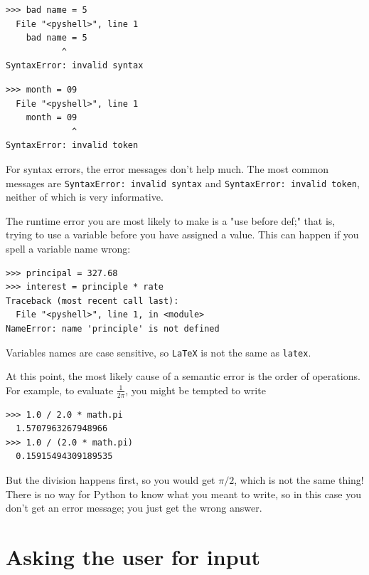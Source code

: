 \begin{Verbatim}[frame=single]
>>> bad name = 5
  File "<pyshell>", line 1
    bad name = 5
           ^
SyntaxError: invalid syntax
\end{Verbatim}

\begin{Verbatim}[frame=single]
>>> month = 09
  File "<pyshell>", line 1
    month = 09
             ^
SyntaxError: invalid token
\end{Verbatim}

For syntax errors, the error messages don't help much. The most common messages are
\texttt{SyntaxError:\ invalid\ syntax} and
\texttt{SyntaxError:\ invalid\ token}, neither of which is very informative.

  
 

The runtime error you are most likely to make is a "use before def;" that is, trying to use a variable before you have assigned a value. This can happen if you spell a variable name wrong:

\begin{Verbatim}[frame=single]
>>> principal = 327.68
>>> interest = principle * rate
Traceback (most recent call last):
  File "<pyshell>", line 1, in <module>
NameError: name 'principle' is not defined
\end{Verbatim}

Variables names are case sensitive, so \texttt{LaTeX} is not the same as \texttt{latex}.

 

At this point, the most likely cause of a semantic error is the order of operations. For example, to evaluate \(\frac{1}{2 \pi}\),
you might be tempted to write

\begin{Verbatim}[frame=single]
>>> 1.0 / 2.0 * math.pi
  1.5707963267948966
>>> 1.0 / (2.0 * math.pi)
  0.15915494309189535
\end{Verbatim}

But the division happens first, so you would get \(\pi / 2\), which is not the same thing! There is no way for Python to know what you meant to write, so in this case you don't get an error message; you just get the wrong answer.


\section{Asking the user for input}


